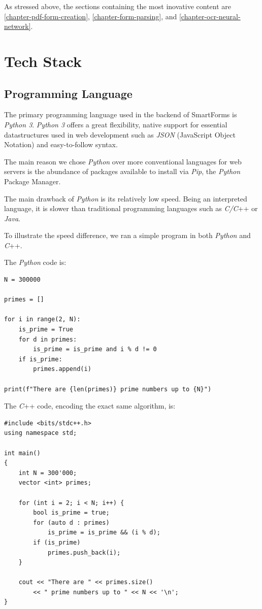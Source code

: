 \documentclass[11pt, a4paper]{report}
\begin{document}
As stressed above, the sections containing the most inovative content are  \autoref{chapter-pdf-form-creation}, \autoref{chapter-form-parsing}, and \autoref{chapter-ocr-neural-network}.

\chapter{Tech Stack}
\label{chapter-tech-stack}

\section{Programming Language}

The primary programming language used in the backend of SmartForms is \textit{Python 3}.
\textit{Python 3} offers a great flexibility, native support for essential datastructures used in web development such as \textit{JSON} (JavaScript Object Notation) and easy-to-follow syntax.

The main reason we chose \textit{Python} over more conventional languages for web servers is the abundance of packages available to install via \textit{Pip}, the \textit{Python} Package Manager.

The main drawback of \textit{Python} is its relatively low speed. Being an interpreted language, it is slower than traditional programming languages such as \textit{C/C}++ or \textit{Java}.

To illustrate the speed difference, we ran a simple program in both \textit{Python} and \textit{C}++.

The \textit{Python} code is:

\begin{verbatim}
N = 300000

primes = []

for i in range(2, N):
    is_prime = True
    for d in primes:
        is_prime = is_prime and i % d != 0
    if is_prime:
        primes.append(i)

print(f"There are {len(primes)} prime numbers up to {N}")
\end{verbatim}

The \textit{C}++ code, encoding the exact same algorithm, is:
\begin{verbatim}
#include <bits/stdc++.h>
using namespace std;

int main()
{
    int N = 300'000;
    vector <int> primes;

    for (int i = 2; i < N; i++) {
        bool is_prime = true;
        for (auto d : primes)
            is_prime = is_prime && (i % d);
        if (is_prime)
            primes.push_back(i);
    }

    cout << "There are " << primes.size()
        << " prime numbers up to " << N << '\n';
}
\end{verbatim}
\end{document}
